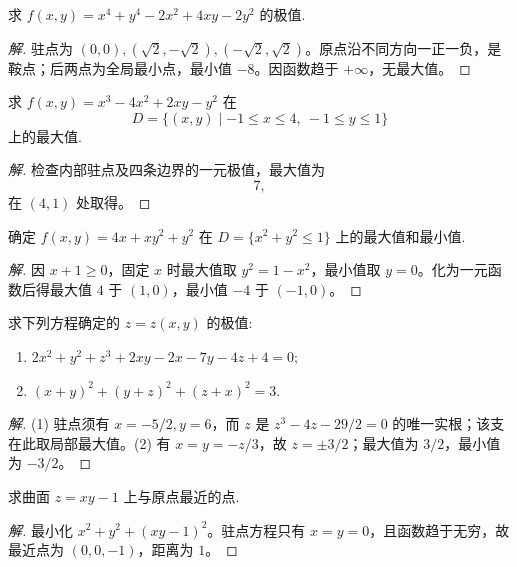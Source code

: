 \documentclass[../../数学分析培优讲义(答案版).tex]{subfiles}
\begin{document}

\begin{example}
求 $f(x,y)=x^4+y^4-2x^2+4xy-2y^2$ 的极值.
\end{example}

\begin{proof}[解]
驻点为 $(0,0),(\sqrt{2},-\sqrt{2}),(-\sqrt{2},\sqrt{2})$。原点沿不同方向一正一负，是鞍点；后两点为全局最小点，最小值 $-8$。因函数趋于 $+\infty$，无最大值。
\end{proof}

\begin{example}
求 $f(x,y)=x^3-4x^2+2xy-y^2$ 在
\[
    D=\{(x,y)\mid -1\leq x\leq4,\ -1\leq y\leq1\}
\]
上的最大值.
\end{example}

\begin{proof}[解]
检查内部驻点及四条边界的一元极值，最大值为
\[
7,
\]
在 $(4,1)$ 处取得。
\end{proof}

\begin{example}
确定 $f(x,y)=4x+xy^2+y^2$ 在 $D=\{x^2+y^2\leq1\}$ 上的最大值和最小值.
\end{example}

\begin{proof}[解]
因 $x+1\geq0$，固定 $x$ 时最大值取 $y^2=1-x^2$，最小值取 $y=0$。化为一元函数后得最大值 $4$ 于 $(1,0)$，最小值 $-4$ 于 $(-1,0)$。
\end{proof}

\begin{example}
求下列方程确定的 $z=z(x,y)$ 的极值:
\begin{enumerate}[label=(\arabic*)]
    \item $2x^2+y^2+z^3+2xy-2x-7y-4z+4=0$;
    \item $(x+y)^2+(y+z)^2+(z+x)^2=3$.
\end{enumerate}
\end{example}

\begin{proof}[解]
(1) 驻点须有 $x=-5/2,y=6$，而 $z$ 是 $z^3-4z-29/2=0$ 的唯一实根；该支在此取局部最大值。(2) 有 $x=y=-z/3$，故 $z=\pm3/2$；最大值为 $3/2$，最小值为 $-3/2$。
\end{proof}

\begin{example}
求曲面 $z=xy-1$ 上与原点最近的点.
\end{example}

\begin{proof}[解]
最小化 $x^2+y^2+(xy-1)^2$。驻点方程只有 $x=y=0$，且函数趋于无穷，故最近点为 $(0,0,-1)$，距离为 $1$。
\end{proof}
\end{document}
